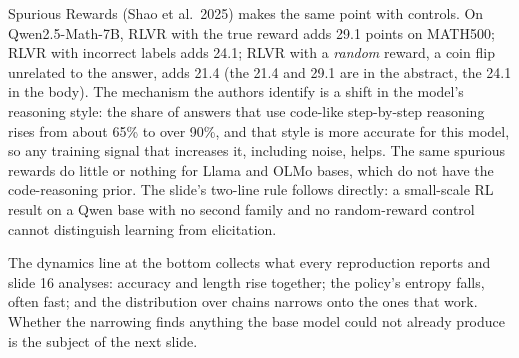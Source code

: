 \documentclass[11pt,letterpaper]{article}
\begin{document}
Spurious Rewards (Shao et al.\ 2025) makes the same point with controls. On Qwen2.5-Math-7B, RLVR with the true reward adds 29.1 points on MATH500; RLVR with incorrect labels adds 24.1; RLVR with a \emph{random} reward, a coin flip unrelated to the answer, adds 21.4 (the 21.4 and 29.1 are in the abstract, the 24.1 in the body). The mechanism the authors identify is a shift in the model's reasoning style: the share of answers that use code-like step-by-step reasoning rises from about 65\% to over 90\%, and that style is more accurate for this model, so any training signal that increases it, including noise, helps. The same spurious rewards do little or nothing for Llama and OLMo bases, which do not have the code-reasoning prior. The slide's two-line rule follows directly: a small-scale RL result on a Qwen base with no second family and no random-reward control cannot distinguish learning from elicitation.

The dynamics line at the bottom collects what every reproduction reports and slide 16 analyses: accuracy and length rise together; the policy's entropy falls, often fast; and the distribution over chains narrows onto the ones that work. Whether the narrowing finds anything the base model could not already produce is the subject of the next slide.
\end{document}
